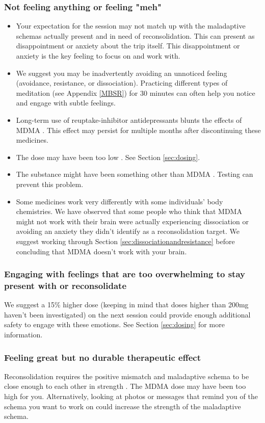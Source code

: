 \documentclass[12pt,letterpaper]{article}
\begin{document}
\subsubsection{Not feeling anything or feeling "meh"}
\begin{itemize}
    \item Your expectation for the session may not match up with the maladaptive schemas actually present and in need of reconsolidation. This can present as disappointment or anxiety about the trip itself. This disappointment or anxiety is the key feeling to focus on and work with.
    \item We suggest you may be inadvertently avoiding an unnoticed feeling (avoidance, resistance, or dissociation). Practicing different types of meditation (see Appendix \ref{MBSR}) for 30 minutes can often help you notice and engage with subtle feelings.
    \item Long-term use of reuptake-inhibitor antidepressants blunts the effects of MDMA \cite{feducciaSSRIDiscontinuation}. This effect may persist for multiple months after discontinuing these medicines.
    \item The dose may have been too low \cite{bediMDMALowDose}. See Section \ref{sec:dosing}.
    \item The substance might have been something other than MDMA \cite{saleemiAdulterants}. Testing can prevent this problem.
    \item Some medicines work very differently with some individuals' body chemistries. We have observed that some people who think that MDMA might not work with their brain were actually experiencing dissociation or avoiding an anxiety they didn't identify as a reconsolidation target. We suggest working through Section \ref{sec:dissociationandresistance} before concluding that MDMA doesn't work with your brain. 
\end{itemize}
\subsubsection{Engaging with feelings that are too overwhelming to stay present with or reconsolidate}
We suggest a 15\% higher dose (keeping in mind that doses higher than 200mg haven't been investigated) on the next session could provide enough additional safety to engage with these emotions. See Section \ref{sec:dosing} for more information.
\subsubsection{Feeling great but no durable therapeutic effect}
Reconsolidation requires the positive mismatch and maladaptive schema to be close enough to each other in strength \cite{eckerUnlocking}. The MDMA dose may have been too high for you. Alternatively, looking at photos or messages that remind you of the schema you want to work on could increase the strength of the maladaptive schema.
\end{document}
